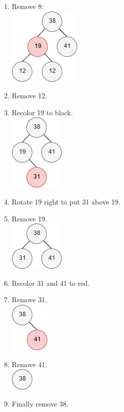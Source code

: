 \documentclass{article}
\begin{document}
\begin{enumerate}
    \begin{enumerate}
      \item Remove 8:\\
      \includegraphics[scale=0.5]{2a.png}
      \item Remove 12.
      \item Recolor 19 to black.\\
      \includegraphics[scale=0.5]{2b.png}
      \item Rotate 19 right to put 31 above 19.
      \item Remove 19.\\
      \includegraphics[scale=0.5]{2c.png}
      \item Recolor 31 and 41 to red.
      \item Remove 31.\\
      \includegraphics[scale=0.5]{2d.png}
      \item Remove 41.\\
      \includegraphics[scale=0.5]{2e.png}
      \item Finally remove 38.
    \end{enumerate}


\end{enumerate}
\end{document}
